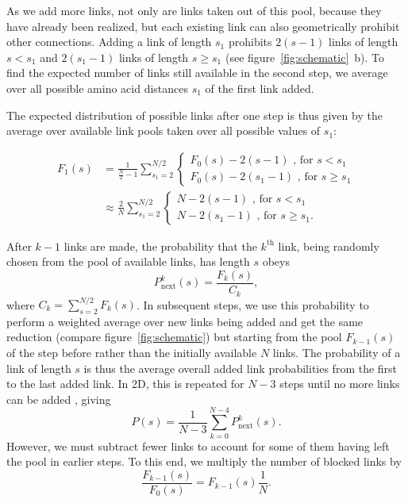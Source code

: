 \documentclass[10pt]{iopart}
\newcommand{\Pin}{P_{\mathrm{next}}}
\begin{document}
As we add more links, not only are links taken out of this pool, because they have already been realized, but each existing link can also geometrically prohibit other connections. Adding a link of length $s_1$ prohibits $2(s-1)$ links of length $s<s_1$ and $2(s_1-1)$ links of length $s\geq s_1$ (see figure~\ref{fig:schematic}~b). To find the expected number of links still available in the second step, we average over all possible amino acid distances $s_1$ of the first link added.

The expected distribution of possible links after one step is thus given by the average over available link pools taken over all possible values of $s_1$:


\begin{align}
    F_1(s)&=\frac{1}{\frac{N}{2}-1} \sum_{s_1=2}^{N/2}{ \begin{cases}
    F_0(s)-2(s-1) \text{ , for } s<s_1\\
    F_0(s)-2(s_1 -1)\text{ , for } s\geq s_1
    \end{cases}}\nonumber\\
    &\approx\frac{2}{N} \sum_{s_1=2}^{N/2} { \begin{cases}
    N-2(s-1) \text{ , for } s<s_1\\
    N-2(s_1 -1)\text{ , for } s\geq s_1.
    \end{cases}}
\label{eq:reduction_first_step}
\end{align}

After $k-1$ links are made, the probability that the $k^{\mathrm{th}}$ link, being randomly chosen from the pool of available links, has length $s$ obeys
\begin{equation}
    \Pin^k(s)=\frac{F_k(s)}{C_k},
    \label{eq.Pnext}
\end{equation}
where $C_k=\sum_{s=2}^{N/2}F_k(s)$. In subsequent steps, we use this probability to perform a weighted average over new links being added and get the same reduction (compare figure~\ref{fig:schematic}) but starting from the pool $F_{k-1}(s)$ of the step before rather than the initially available $N$ links. 
The probability of a link of length $s$ is thus the average overall added link probabilities from the first to the last added link. In 2D, this is repeated for $N-3$ steps until no more links can be added \cite{molkenthin2016scaling}, giving
\begin{equation}
    P(s)=\frac{1}{N-3}\sum_{k=0}^{N-4} \Pin^k(s).
    \label{eq.P_next_sum}
\end{equation}
However, we must subtract fewer links to account for some of them having left the pool in earlier steps. To this end, we multiply the number of blocked links by
\begin{equation}
    \frac{F_{k-1}(s)}{F_0(s)} = F_{k-1}(s)\frac{1}{N}.
\end{equation}
\end{document}
